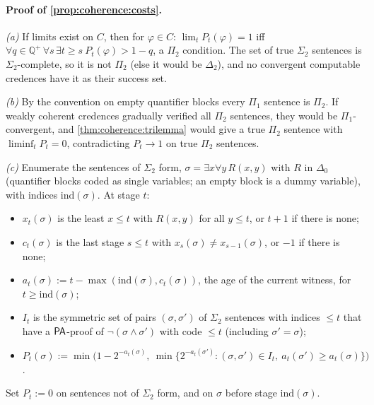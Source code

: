 \paragraph{Proof of \cref{prop:coherence:costs}.} \emph{(a)} If limits exist on $C$, then for $\varphi\in C$: $\lim_tP_t(\varphi)=1$ iff $\forall q\in\mathbb Q^+\,\forall s\,\exists t\ge s\ P_t(\varphi)>1-q$, a $\Pi_2$ condition. The set of true $\Sigma_2$ sentences is $\Sigma_2$-complete, so it is not $\Pi_2$ (else it would be $\Delta_2$), and no convergent computable credences have it as their success set.

\emph{(b)} By the convention on empty quantifier blocks every $\Pi_1$ sentence is $\Pi_2$. If weakly coherent credences gradually verified all $\Pi_2$ sentences, they would be $\Pi_1$-convergent, and \cref{thm:coherence:trilemma} would give a true $\Pi_2$ sentence with $\liminf_tP_t=0$, contradicting $P_t\to1$ on true $\Pi_2$ sentences.

\emph{(c)} Enumerate the sentences of $\Sigma_2$ form, $\sigma=\exists x\forall y\,R(x,y)$ with $R$ in $\Delta_0$ (quantifier blocks coded as single variables; an empty block is a dummy variable), with indices $\mathrm{ind}(\sigma)$. At stage $t$:
\begin{itemize}[leftmargin=*]
\item $x_t(\sigma)$ is the least $x\le t$ with $R(x,y)$ for all $y\le t$, or $t+1$ if there is none;
\item $c_t(\sigma)$ is the last stage $s\le t$ with $x_s(\sigma)\neq x_{s-1}(\sigma)$, or $-1$ if there is none;
\item $a_t(\sigma):=t-\max(\mathrm{ind}(\sigma),c_t(\sigma))$, the age of the current witness, for $t\ge\mathrm{ind}(\sigma)$;
\item $I_t$ is the symmetric set of pairs $(\sigma,\sigma')$ of $\Sigma_2$ sentences with indices $\le t$ that have a $\mathsf{PA}$-proof of $\neg(\sigma\wedge\sigma')$ with code $\le t$ (including $\sigma'=\sigma$);
\item $P_t(\sigma):=\min\bigl(1-2^{-a_t(\sigma)},\ \min\{2^{-a_t(\sigma')}:(\sigma,\sigma')\in I_t,\ a_t(\sigma')\ge a_t(\sigma)\}\bigr)$.
\end{itemize}
Set $P_t:=0$ on sentences not of $\Sigma_2$ form, and on $\sigma$ before stage $\mathrm{ind}(\sigma)$.

